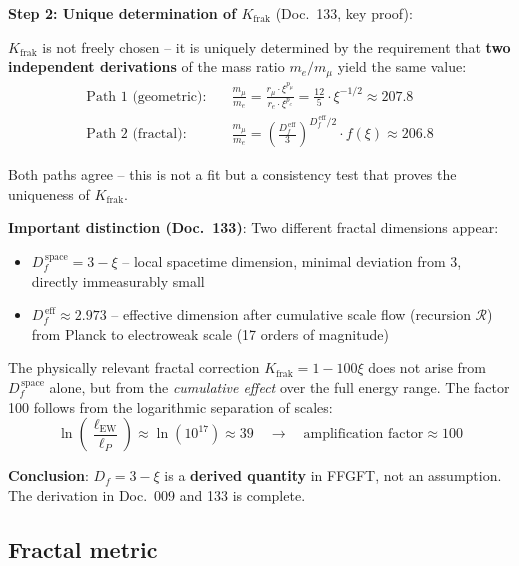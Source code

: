 \textbf{Step 2: Unique determination of $K_{\text{frak}}$}
(Doc.~133, key proof):

$K_{\text{frak}}$ is not freely chosen -- it is uniquely determined
by the requirement that \textbf{two independent derivations} of the
mass ratio $m_e/m_\mu$ yield the same value:
\begin{align}
    \text{Path 1 (geometric):} &\quad
    \frac{m_\mu}{m_e} = \frac{r_\mu \cdot \xi^{p_\mu}}{r_e \cdot \xi^{p_e}}
    = \frac{12}{5} \cdot \xi^{-1/2} \approx 207.8 \\
    \text{Path 2 (fractal):} &\quad
    \frac{m_\mu}{m_e} = \left(\frac{D_f^{\,\text{eff}}}{3}\right)^{\!D_f^{\,\text{eff}}/2}
    \cdot f(\xi) \approx 206.8
\end{align}

Both paths agree -- this is not a fit but a consistency test that
proves the uniqueness of $K_{\text{frak}}$.

\textbf{Important distinction (Doc.~133)}: Two different fractal
dimensions appear:
\begin{itemize}
    \item $D_f^{\,\text{space}} = 3 - \xi$ -- local spacetime dimension,
          minimal deviation from 3, directly immeasurably small
    \item $D_f^{\,\text{eff}} \approx 2.973$ -- effective dimension after
          cumulative scale flow (recursion $\mathcal{R}$) from Planck to
          electroweak scale (17 orders of magnitude)
\end{itemize}

The physically relevant fractal correction $K_{\text{frak}} = 1 - 100\xi$
does not arise from $D_f^{\,\text{space}}$ alone, but from the
\emph{cumulative effect} over the full energy range. The factor 100
follows from the logarithmic separation of scales:
\begin{equation}
    \ln\!\left(\frac{\ell_{\text{EW}}}{\ell_P}\right)
    \approx \ln\!\left(10^{17}\right)
    \approx 39 \quad \longrightarrow \quad
    \text{amplification factor} \approx 100
\end{equation}

\textbf{Conclusion}: $D_f = 3 - \xi$ is a \textbf{derived quantity}
in FFGFT, not an assumption. The derivation in Doc.~009 and 133
is complete.

\subsection{Fractal metric}

